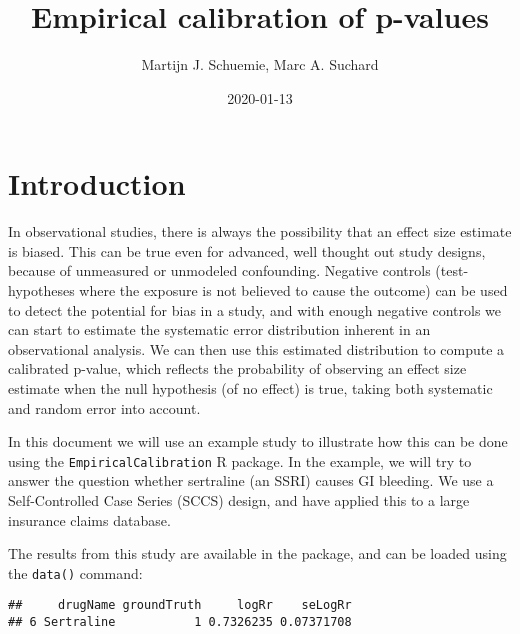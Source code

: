 \documentclass[
]{article}
\title{Empirical calibration of p-values}
\author{Martijn J. Schuemie, Marc A. Suchard}
\date{2020-01-13}
\newenvironment{Shaded}{\begin{snugshade}}{\end{snugshade}}
\newcommand{\DecValTok}[1]{\textcolor[rgb]{0.00,0.00,0.81}{#1}}
\newcommand{\KeywordTok}[1]{\textcolor[rgb]{0.13,0.29,0.53}{\textbf{#1}}}
\newcommand{\NormalTok}[1]{#1}
\newcommand{\OperatorTok}[1]{\textcolor[rgb]{0.81,0.36,0.00}{\textbf{#1}}}
\newcommand{\StringTok}[1]{\textcolor[rgb]{0.31,0.60,0.02}{#1}}
\begin{document}
\maketitle

{
\setcounter{tocdepth}{2}
\tableofcontents
}
\hypertarget{introduction}{%
\section{Introduction}\label{introduction}}

In observational studies, there is always the possibility that an effect
size estimate is biased. This can be true even for advanced, well
thought out study designs, because of unmeasured or unmodeled
confounding. Negative controls (test-hypotheses where the exposure is
not believed to cause the outcome) can be used to detect the potential
for bias in a study, and with enough negative controls we can start to
estimate the systematic error distribution inherent in an observational
analysis. We can then use this estimated distribution to compute a
calibrated p-value, which reflects the probability of observing an
effect size estimate when the null hypothesis (of no effect) is true,
taking both systematic and random error into account.

In this document we will use an example study to illustrate how this can
be done using the \texttt{EmpiricalCalibration} R package. In the
example, we will try to answer the question whether sertraline (an SSRI)
causes GI bleeding. We use a Self-Controlled Case Series (SCCS) design,
and have applied this to a large insurance claims database.

The results from this study are available in the package, and can be
loaded using the \texttt{data()} command:

\begin{Shaded}
\end{Shaded}

\begin{verbatim}
##     drugName groundTruth     logRr    seLogRr
## 6 Sertraline           1 0.7326235 0.07371708
\end{verbatim}

\begin{Shaded}
\end{Shaded}
\end{document}
